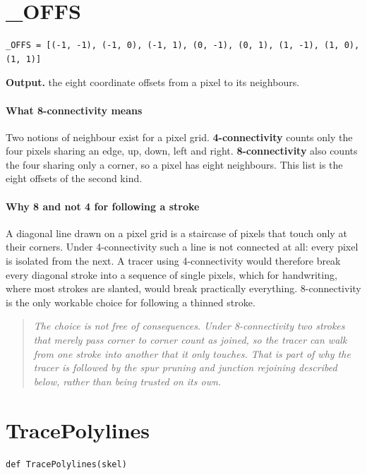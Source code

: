 \section{\_OFFS}
\begin{lstlisting}[style=sig]
_OFFS = [(-1, -1), (-1, 0), (-1, 1), (0, -1), (0, 1), (1, -1), (1, 0), (1, 1)]
\end{lstlisting}

\noindent\textbf{Output.} the eight coordinate offsets from a pixel to its neighbours.


\paragraph{What 8-connectivity means}
Two notions of neighbour exist for a pixel grid. \textbf{4-connectivity} counts only the four pixels sharing an edge, up, down, left and right. \textbf{8-connectivity} also counts the four sharing only a corner, so a pixel has eight neighbours. This list is the eight offsets of the second kind.


\paragraph{Why 8 and not 4 for following a stroke}
A diagonal line drawn on a pixel grid is a staircase of pixels that touch only at their corners. Under 4-connectivity such a line is not connected at all: every pixel is isolated from the next. A tracer using 4-connectivity would therefore break every diagonal stroke into a sequence of single pixels, which for handwriting, where most strokes are slanted, would break practically everything. 8-connectivity is the only workable choice for following a thinned stroke.


\begin{quote}\small\itshape The choice is not free of consequences. Under 8-connectivity two strokes that merely pass corner to corner count as joined, so the tracer can walk from one stroke into another that it only touches. That is part of why the tracer is followed by the spur pruning and junction rejoining described below, rather than being trusted on its own.\end{quote}

\section{TracePolylines}
\begin{lstlisting}[style=sig]
def TracePolylines(skel)
\end{lstlisting}

